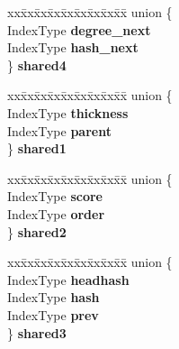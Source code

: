 \begin{DoxyCompactItemize}
\begin{tabbing}
\end{tabbing}\item 
\mbox{\label{struct_eigen_1_1internal_1_1colamd__col_a66ace69ae8beef66c0015a94aa2e38c2}} 
\begin{tabbing}
xx\=xx\=xx\=xx\=xx\=xx\=xx\=xx\=xx\=\kill
union \{\\
\>IndexType {\bfseries degree\_next}\\
\>IndexType {\bfseries hash\_next}\\
\} {\bfseries shared4}\\

\end{tabbing}\item 
\mbox{\label{struct_eigen_1_1internal_1_1colamd__col_a1a721733f91f4fe497b4b7a20dec4ddf}} 
\begin{tabbing}
xx\=xx\=xx\=xx\=xx\=xx\=xx\=xx\=xx\=\kill
union \{\\
\>IndexType {\bfseries thickness}\\
\>IndexType {\bfseries parent}\\
\} {\bfseries shared1}\\

\end{tabbing}\item 
\mbox{\label{struct_eigen_1_1internal_1_1colamd__col_ab641dafa675d876be29e9f35058249ac}} 
\begin{tabbing}
xx\=xx\=xx\=xx\=xx\=xx\=xx\=xx\=xx\=\kill
union \{\\
\>IndexType {\bfseries score}\\
\>IndexType {\bfseries order}\\
\} {\bfseries shared2}\\

\end{tabbing}\item 
\mbox{\label{struct_eigen_1_1internal_1_1colamd__col_a39f8de3ea0408eaded8bf5b04ee6c94e}} 
\begin{tabbing}
xx\=xx\=xx\=xx\=xx\=xx\=xx\=xx\=xx\=\kill
union \{\\
\>IndexType {\bfseries headhash}\\
\>IndexType {\bfseries hash}\\
\>IndexType {\bfseries prev}\\
\} {\bfseries shared3}\\


\end{tabbing}
\end{DoxyCompactItemize}

